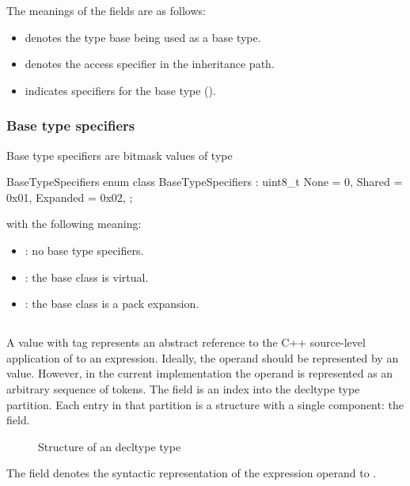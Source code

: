 The meanings of the fields are as follows:
\begin{itemize} 
	\item {} denotes the type base being used as a base type.
	\item {} denotes the access specifier in the inheritance path.
	\item {} indicates specifiers for the base type ().
\end{itemize}



\subsubsection{Base type specifiers}
\label{sec:ifc-base-type-specifiers}

Base type specifiers are bitmask values of type
\begin{typedef}{BaseTypeSpecifiers}{}
	enum class BaseTypeSpecifiers : uint8_t {
		None		= 0,
		Shared		= 0x01,
		Expanded    = 0x02,
	};
\end{typedef}
%
with the following meaning:
\begin{itemize}
	\item {}: no base type specifiers.
	\item {}: the base class is virtual.
	\item {}: the base class is a pack expansion.
\end{itemize}


\subsection{}
\label{sec:ifc:TypeSort:Decltype}

A  value with tag  represents
an abstract reference to the C++ source-level application of  to
an expression. Ideally, the operand should be represented by an 
value.  However, in the current implementation the operand is represented
as an arbitrary sequence of tokens.
The  field is an index into the decltype type partition.
Each entry in that partition is a structure with a single component: the  field.
%
\begin{figure}[H]
	\centering
	\caption{Structure of an decltype type}
	\label{fig:ifc-decltype-type-structure}
\end{figure}
%
The  field denotes the syntactic representation of the expression operand to .

